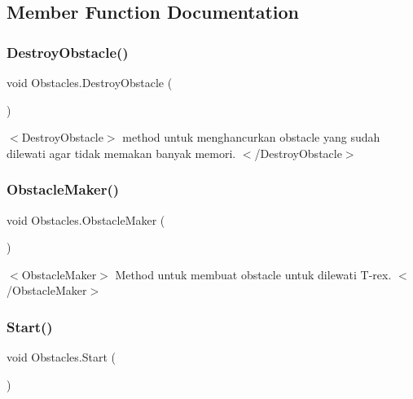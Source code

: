 \subsection{Member Function Documentation}
\hypertarget{class_obstacles_adabe54fa108d13e6200892eb8019a126}{}\label{class_obstacles_adabe54fa108d13e6200892eb8019a126} 
\subsubsection{\texorpdfstring{Destroy\+Obstacle()}{DestroyObstacle()}}
{\footnotesize\ttfamily void Obstacles.\+Destroy\+Obstacle (\begin{DoxyParamCaption}{ }\end{DoxyParamCaption})\hspace{0.3cm}{\ttfamily [private]}}

$<$\+Destroy\+Obstacle$>$ method untuk menghancurkan obstacle yang sudah dilewati agar tidak memakan banyak memori. $<$/\+Destroy\+Obstacle$>$ \hypertarget{class_obstacles_aa7b4a059d29fce38f79a38e735621698}{}\label{class_obstacles_aa7b4a059d29fce38f79a38e735621698} 
\subsubsection{\texorpdfstring{Obstacle\+Maker()}{ObstacleMaker()}}
{\footnotesize\ttfamily void Obstacles.\+Obstacle\+Maker (\begin{DoxyParamCaption}{ }\end{DoxyParamCaption})\hspace{0.3cm}{\ttfamily [private]}}

$<$\+Obstacle\+Maker$>$ Method untuk membuat obstacle untuk dilewati T-\/rex. $<$/\+Obstacle\+Maker$>$ \hypertarget{class_obstacles_a32cfaa5f6c916ff526398a7a42dc8928}{}\label{class_obstacles_a32cfaa5f6c916ff526398a7a42dc8928} 
\subsubsection{\texorpdfstring{Start()}{Start()}}
{\footnotesize\ttfamily void Obstacles.\+Start (\begin{DoxyParamCaption}{ }\end{DoxyParamCaption})\hspace{0.3cm}{\ttfamily [private]}}

